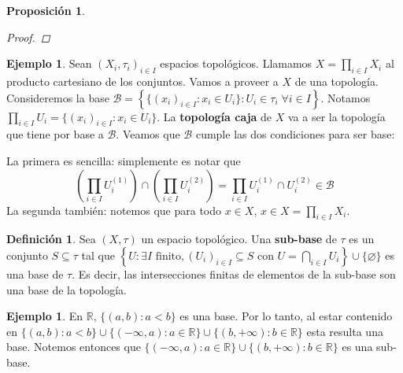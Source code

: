 \documentclass[12pt]{book}
\newtheorem{prop}[teo]{Proposición}
\theoremstyle{definition}
\newtheorem{defn}[teo]{Definición}
\newtheorem{ex}[teo]{Ejemplo}
\newcommand{\RR}{\mathbb{R}}      %
\let\emptyset\varnothing
\begin{document}
\begin{prop}
\begin{proof}
\end{proof}
\end{prop}

\begin{ex}
Sean $(X_i,\tau_i)_{i\in I}$ espacios topológicos. Llamamos $X = \displaystyle\prod_{i\in I} X_i$ al producto cartesiano de los conjuntos. Vamos a proveer a $X$ de una topología. Consideremos la base $\mathscr{B} = \left\{\{(x_i)_{i\in I} : x_i\in U_i\} : U_i\in \tau_i \;\forall i\in I\right\}$. Notamos $\displaystyle\prod_{i\in I} U_i = \{(x_i)_{i\in I} : x_i\in U_i\}$. La \textbf{topología caja} de $X$ va a ser la topología que tiene por base a $\mathscr{B}$. Veamos que $\mathscr{B}$ cumple las dos condiciones para ser base:

La primera es sencilla: simplemente es notar que $$\left(\displaystyle\prod_{i\in I} U_i^{(1)}\right) \cap \left( \displaystyle\prod_{i\in I}U_i^{(2)}\right) = \displaystyle\prod_{i\in I} U_i^{(1)}\cap U_i^{(2)} \in\mathscr{B}$$ La segunda también: notemos que para todo $x\in X$, $x\in X = \displaystyle\prod_{i\in I}X_i$.
\end{ex}

\begin{defn}
Sea $(X,\tau)$ un espacio topológico. Una \textbf{sub-base} de $\tau$ es un conjunto $S\subseteq \tau$ tal que $\left\{U : \exists I \text{ finito}, (U_i)_{i\in I}\subseteq S \text{ con } U = \displaystyle\bigcap_{i\in I}U_i \right\}\cup\{\emptyset\}$ es una base de $\tau$. Es decir, las intersecciones finitas de elementos de la sub-base son una base de la topología.
\end{defn}

\begin{ex}
En $\RR$, $\{(a,b) : a<b\}$ es una base. Por lo tanto, al estar contenido en $\{(a,b) : a<b\}\cup \{(-\infty,a) : a\in\RR\}\cup \{(b,+\infty):b\in\RR\}$ esta resulta una base. Notemos entonces que $\{(-\infty,a):a\in\RR\}\cup \{(b,+\infty):b\in\RR\}$ es una sub-base.
\end{ex}
\end{document}
